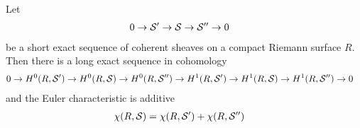 \documentclass[12pt]{article}
\begin{document}
\begin{theorem}\label{theorem:long_exact_sequence_cohomology}
    Let \begin{align*}
        0 \to {\mathcal{S}}' & \to {\mathcal{S}} \to {\mathcal{S}}'' \to 0
    \end{align*} be a short exact sequence of coherent sheaves on a compact Riemann surface $R$. Then there is a long exact sequence in cohomology \begin{align*}
        0 \to H^0(R,{\mathcal{S}}') & \to H^0(R,{\mathcal{S}}) \to H^0(R,{\mathcal{S}}'') \to H^1(R,{\mathcal{S}}') \to H^1(R,{\mathcal{S}}) \to H^1(R,{\mathcal{S}}'') \to 0
    \end{align*} and the Euler characteristic is additive \begin{align*}
        \chi(R,{\mathcal{S}}) & = \chi(R,{\mathcal{S}}') + \chi(R,{\mathcal{S}}'')
    \end{align*}
\end{theorem}
\end{document}
